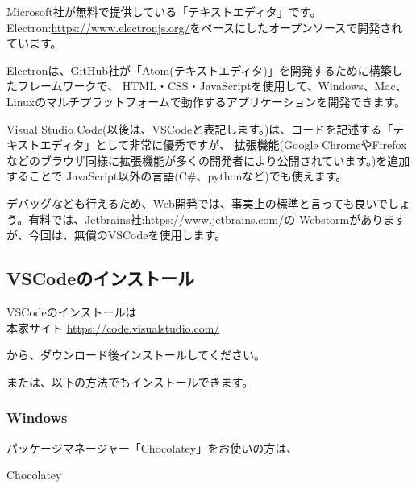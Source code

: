 Microsoft社が無料で提供している「テキストエディタ」です。Electron:\url{https://www.electronjs.org/}をベースにしたオープンソースで開発されています。

\vspace*{\baselineskip}

Electronは、GitHub社が「Atom(テキストエディタ)」を開発するために構築したフレームワークで、
HTML・CSS・JavaScriptを使用して、Windows、Mac、Linuxのマルチプラットフォームで動作するアプリケーションを開発できます。

\vspace*{\baselineskip}

Visual Studio Code(以後は、VSCodeと表記します。)は、コードを記述する「テキストエディタ」として非常に優秀ですが、
拡張機能(Google ChromeやFirefoxなどのブラウザ同様に拡張機能が多くの開発者により公開されています。)を追加することで
JavaScript以外の言語(C\#、pythonなど)でも使えます。

\vspace*{\baselineskip}

デバッグなども行えるため、Web開発では、事実上の標準と言っても良いでしょう。有料では、Jetbrains社:\url{https://www.jetbrains.com/}の
Webstormがありますが、今回は、無償のVSCodeを使用します。

\subsection{VSCodeのインストール}
\keeplastskip{
  \label{sec:1-2-1}
  \par\nobreak
}

VSCodeのインストールは\\[0pt]
本家サイト
\url{https://code.visualstudio.com/}

から、ダウンロード後インストールしてください。

または、以下の方法でもインストールできます。

\subsubsection*{Windows}
\keeplastskip{
  \label{sec:1-2-1-1}
  \par\nobreak
}

パッケージマネージャー「Chocolatey」をお使いの方は、\\[0pt]

\def\startercodeblockfontsize{}
\begin{starterterminal}[]{Chocolatey}\end{starterterminal}

